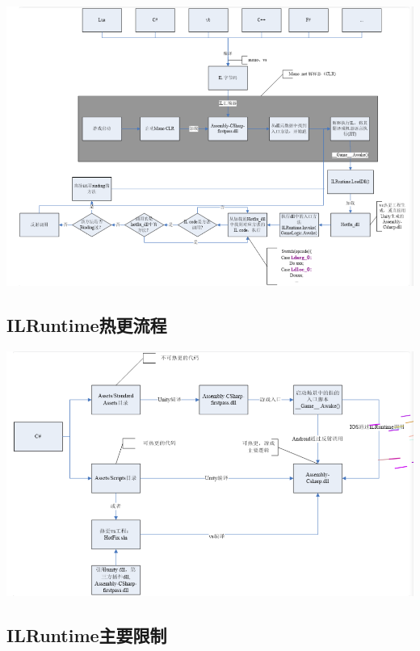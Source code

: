 \documentclass[9pt, b5paper]{article}
\begin{document}
\includegraphics[width=.9\linewidth]{./pic/readme_20220926_094936.png}

\subsection{ILRuntime热更流程}
\label{sec-8-2}

\includegraphics[width=.9\linewidth]{./pic/readme_20220926_095022.png}
\subsection{ILRuntime主要限制}
\label{sec-8-3}
\end{document}
